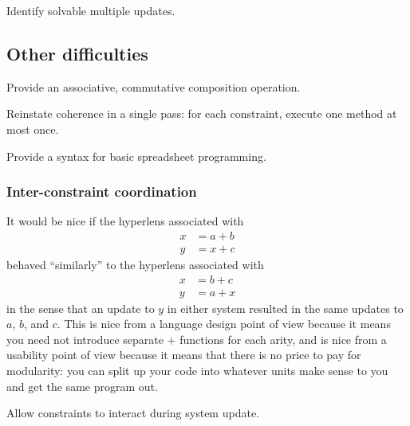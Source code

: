 \begin{desiderata}
    Identify solvable multiple updates.
\end{desiderata}

\subsection{Other difficulties}

\begin{desiderata}
    Provide an associative, commutative composition operation.
\end{desiderata}
\begin{desiderata}
    Reinstate coherence in a single pass: for each constraint, execute one
    method at most once.
\end{desiderata}
\begin{desiderata}
    Provide a syntax for basic spreadsheet programming.
\end{desiderata}

\subsubsection{Inter-constraint coordination}
It would be nice if the hyperlens associated with
\begin{align*}
    x &= a+b \\
    y &= x+c
\end{align*}
behaved ``similarly'' to the hyperlens associated with
\begin{align*}
    x &= b+c \\
    y &= a+x
\end{align*}
in the sense that an update to $y$ in either system resulted in the same
updates to $a$, $b$, and $c$. This is nice from a language design point of
view because it means you need not introduce separate $+$ functions for each
arity, and is nice from a usability point of view because it means that
there is no price to pay for modularity: you can split up your code into
whatever units make sense to you and get the same program out.

\begin{desiderata}
    Allow constraints to interact during system update.
\end{desiderata}
